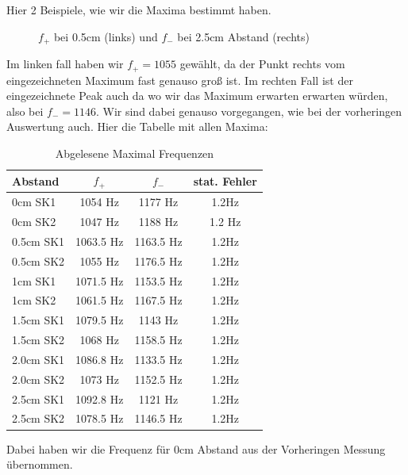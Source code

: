 \documentclass[twoside]{protokoll}
\begin{document}
 
Hier 2 Beispiele, wie wir die Maxima bestimmt haben.
\begin{figure}[H]
    \centering
    \caption{$f_+$ bei 0.5cm (links) und $f_-$ bei 2.5cm Abstand (rechts)}
\end{figure}
Im linken fall haben wir $f_+ = 1055$ gewählt, da der Punkt rechts vom eingezeichneten Maximum fast genauso groß ist.
Im rechten Fall ist der eingezeichnete Peak auch da wo wir das Maximum erwarten erwarten würden, also bei $f_- = 1146$.
Wir sind dabei genauso vorgegangen, wie bei der vorheringen Auswertung auch.
Hier die Tabelle mit allen Maxima:
\begin{table}[H]
        \centering
        \caption{Abgelesene Maximal Frequenzen}
        \begin{tabularx}{0.7\textwidth}{X c c c}
            \toprule
            \textbf{Abstand} & \textbf{$f_+$} & \textbf{$f_-$} & \textbf{stat. Fehler} \\
            \midrule
            0cm SK1 &  1054 Hz & 1177 Hz & 1.2Hz \\
            0cm SK2 &  1047 Hz & 1188 Hz & 1.2 Hz\\
            0.5cm SK1 &  1063.5 Hz & 1163.5 Hz & 1.2Hz \\
            0.5cm SK2 &  1055 Hz & 1176.5 Hz & 1.2Hz \\
            1cm SK1 &  1071.5 Hz & 1153.5 Hz & 1.2Hz \\
            1cm SK2 &  1061.5 Hz & 1167.5 Hz & 1.2Hz \\
            1.5cm SK1 &  1079.5 Hz & 1143 Hz & 1.2Hz \\
            1.5cm SK2 &  1068 Hz & 1158.5 Hz & 1.2Hz \\
            2.0cm SK1 &  1086.8 Hz & 1133.5 Hz & 1.2Hz \\
            2.0cm SK2 &  1073 Hz & 1152.5 Hz & 1.2Hz \\
            2.5cm SK1 &  1092.8 Hz & 1121 Hz & 1.2Hz \\
            2.5cm SK2 &  1078.5 Hz & 1146.5 Hz & 1.2Hz \\
            \bottomrule
        \end{tabularx}
        \label{tab:mytable}
    \end{table}
Dabei haben wir die Frequenz für 0cm Abstand aus der Vorheringen Messung übernommen.
\end{document}
